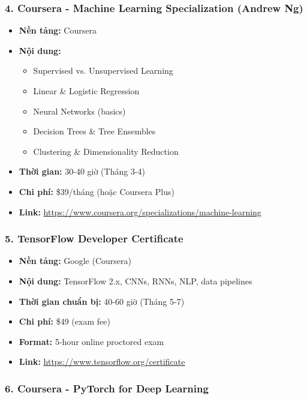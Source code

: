 \documentclass[12pt,a4paper]{article}
\begin{document}
\subsubsection{4. Coursera - Machine Learning Specialization (Andrew Ng)}

\begin{itemize}
    \item \textbf{Nền tảng:} Coursera
    \item \textbf{Nội dung:}
    \begin{itemize}
        \item Supervised vs. Unsupervised Learning
        \item Linear \& Logistic Regression
        \item Neural Networks (basics)
        \item Decision Trees \& Tree Ensembles
        \item Clustering \& Dimensionality Reduction
    \end{itemize}
    \item \textbf{Thời gian:} 30-40 giờ (Tháng 3-4)
    \item \textbf{Chi phí:} \$39/tháng (hoặc Coursera Plus)
    \item \textbf{Link:} \url{https://www.coursera.org/specializations/machine-learning}
\end{itemize}

\subsubsection{5. TensorFlow Developer Certificate}

\begin{itemize}
    \item \textbf{Nền tảng:} Google (Coursera)
    \item \textbf{Nội dung:} TensorFlow 2.x, CNNs, RNNs, NLP, data pipelines
    \item \textbf{Thời gian chuẩn bị:} 40-60 giờ (Tháng 5-7)
    \item \textbf{Chi phí:} \$49 (exam fee)
    \item \textbf{Format:} 5-hour online proctored exam
    \item \textbf{Link:} \url{https://www.tensorflow.org/certificate}
\end{itemize}

\subsubsection{6. Coursera - PyTorch for Deep Learning}
\end{document}
